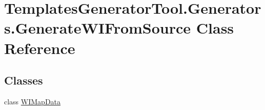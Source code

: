 \hypertarget{class_templates_generator_tool_1_1_generators_1_1_generate_w_i_from_source}{}\section{Templates\+Generator\+Tool.\+Generators.\+Generate\+W\+I\+From\+Source Class Reference}
\label{class_templates_generator_tool_1_1_generators_1_1_generate_w_i_from_source}
\subsection*{Classes}
\begin{DoxyCompactItemize}
\item 
class \mbox{\hyperlink{class_templates_generator_tool_1_1_generators_1_1_generate_w_i_from_source_1_1_w_i_map_data}{W\+I\+Map\+Data}}
\end{DoxyCompactItemize}
